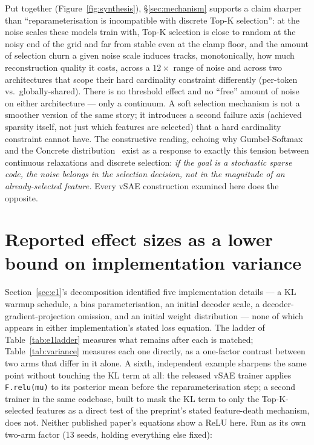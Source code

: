 \documentclass[11pt]{article}
\begin{document}
Put together (Figure~\ref{fig:synthesis}), \S\ref{sec:mechanism} supports a
claim sharper than ``reparameterisation is incompatible with discrete Top-K
selection'': at the noise scales these models train with, Top-K selection is
close to random at the noisy end of the grid and far from stable even at the
clamp floor, and the amount of selection churn a given noise scale induces
tracks, monotonically, how much reconstruction quality it costs, across a
$12\times$ range of noise and across two architectures that scope their hard
cardinality constraint differently (per-token vs.\ globally-shared). There is
no threshold effect and no ``free'' amount of noise on either architecture ---
only a continuum. A soft selection mechanism is not a smoother version of the
same story; it introduces a second failure axis (achieved sparsity itself,
not just which features are selected) that a hard cardinality constraint
cannot have. The constructive reading, echoing why
Gumbel-Softmax~\citep{jang2016categorical} and the Concrete
distribution~\citep{maddison2016concrete} exist as a response to exactly this
tension between continuous relaxations and discrete selection: \emph{if the
goal is a stochastic sparse code, the noise belongs in the selection
decision, not in the magnitude of an already-selected feature.} Every vSAE
construction examined here does the opposite.

\section{Reported effect sizes as a lower bound on implementation variance}
\label{sec:variance}

Section~\ref{sec:e1}'s decomposition identified five implementation details
--- a KL warmup schedule, a bias parameterisation, an initial decoder scale,
a decoder-gradient-projection omission, and an initial weight distribution
--- none of which appears in either implementation's stated loss equation.
The ladder of Table~\ref{tab:e1ladder} measures what remains after each is
matched; Table~\ref{tab:variance} measures each one directly, as a
one-factor contrast between two arms that differ in it alone. A sixth,
independent example
sharpens the same point without touching the KL term at all: the released
vSAE trainer applies \texttt{F.relu(mu)} to its posterior mean before the
reparameterisation step; a second trainer in the same codebase, built to
mask the KL term to only the Top-K-selected features as a direct test of the
preprint's stated feature-death mechanism, does not. Neither published
paper's equations show a ReLU here. Run as its own two-arm factor (13 seeds,
holding everything else fixed):
\end{document}

